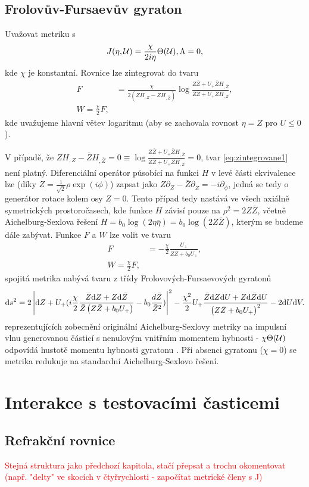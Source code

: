 \subsection{Frolovův-Fursaevův gyraton}
Uvažovat metriku  s
\begin{equation}
    J(\eta, \mathcal{U}) = \frac{\chi}{2 i \eta} \Theta(\mathcal{U}), \Lambda = 0,
\end{equation}
kde $\chi$ je konstantní. Rovnice  lze zintegrovat do tvaru
\begin{equation}
    \label{eq:zintegrovane1}
    \begin{split}
        F &= \frac{\chi}{2(Z H_{,Z}-\bar{Z}H_{,\bar{Z}})} \log \frac{Z\bar{Z}+U_{+}\bar{Z}H_{,\bar{Z}}}{Z\bar{Z}+U_{+}ZH_{,Z}}, \\
        W = \frac{\chi}{2}F,
    \end{split}
\end{equation}
kde uvažujeme hlavní větev logaritmu (aby se zachovala rovnost $\eta = Z$ pro $U \leq 0$).

V případě, že $Z H_{,Z} - \bar{Z}H_{,\bar{Z}}=0 \equiv \log \frac{Z \bar{Z} + U_{+}\bar{Z}H_{,\bar{Z}}}{Z\bar{Z}+U_{+}ZH_{,Z}}=0$,
tvar \eqref{eq:zintegrovane1} není platný. Diferenciální operátor působící na funkci $H$ v levé části ekvivalence
lze (díky $Z = \frac{1}{\sqrt{2}} \rho \exp(i \phi)$) zapsat jako $Z \partial_Z - \bar{Z}\partial_{\bar{Z}} = - i \partial_\phi$,
jedná se tedy o generátor rotace kolem osy $Z = 0$. Tento případ tedy nastává ve všech axiálně symetrických prostoročasech, kde
funkce $H$ závisí pouze na $\rho^2 = 2 Z \bar{Z}$, včetně Aichelburg-Sexlova řešení
$H = b_0 \log(2\eta \bar{\eta}) = b_0 \log (2Z \bar{Z})$, kterým se budeme dále zabývat.
Funkce $F$ a $W$ lze volit ve tvaru
\begin{equation}
    \begin{split}
        F &= -\frac{\chi}{2} \frac{U_{+}}{Z \bar{Z} + b_0 U_{+}}, \\
        W = \frac{\chi}{2}F,
    \end{split}
\end{equation}
spojitá metrika nabývá tvaru z třídy Frolovových-Fursaevových gyratonů \cite{Frolov2005}
\begin{equation}
    \mathrm{d} s^2 = 2 \left| \mathrm{d} Z + U_{+} (i \frac{\chi}{2}\frac{\bar{Z}\mathrm{d} Z + Z \mathrm{d} \bar{Z}}{\bar{Z}\left(Z \bar{Z} + b_0 U_{+}\right)} - b_0 \frac{d\bar{Z}}{\bar{Z}^2}) \right|^2
    - \frac{\chi^2}{2}U_{+}\frac{\bar{Z} \mathrm{d} Z \mathrm{d} U + Z \mathrm{d} \bar{Z} \mathrm{d} U}{\left(Z \bar{Z} + b_0 U_{+}\right)^2} - 2 \mathrm{d} U \mathrm{d} V.
\end{equation}
reprezentujících zobecnění
originální Aichelburg-Sexlovy metriky \cite{Aichelburg_1971} na impulsní vlnu generovanou částicí s
nenulovým vnitřním momentem hybnosti - $\chi \Theta(\mathcal{U})$ odpovídá hustotě momentu hybnosti gyratonu \cite{Podolsky2014}.
Při absenci gyratonu ($\chi=0$) se metrika redukuje na standardní Aichelburg-Sexlovo řešení.

\section{Interakce s testovacími časticemi}
\subsection{Refrakční rovnice}
\textcolor{red}{Stejná struktura jako předchozí kapitola, stačí přepsat a trochu okomentovat
(např. "delty" ve skocích v čtyřrychlosti - započítat metrické členy s J)}
